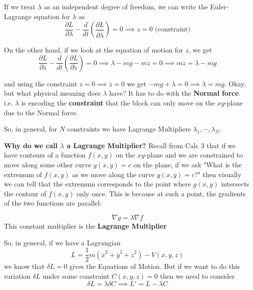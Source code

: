 \documentclass[11pt]{article}
\begin{document}
\vskip 0.5cm
If we treat $\lambda$ as an independent degree of freedom, we can write the Euler-Lagrange equation for $\lambda$ as 
\[ \frac{\partial L}{\partial \lambda} - \frac{d}{dt} \left(\frac{\partial L}{\partial \dot{\lambda}}\right) = 0 \implies z = 0 \text{ (constraint)} \]

On the other hand, if we look at the equation of motion for $z$, we get 
\[  \frac{\partial L}{\partial z} - \frac{d}{dt} \left(\frac{\partial L}{\partial \dot{z}}\right) = 0 \implies \lambda - mg - m\ddot{z} = 0 \implies m\ddot{z} = \lambda - mg \]

and using the constraint $z = 0 \implies \ddot{z} = 0$ we get $-mg + \lambda = 0 \implies \lambda = mg$. Okay, but what physical meaning does $\lambda$ have? It has to do with the \textbf{Normal force}. i.e. $\lambda$ is encoding the \textbf{constraint} that the block can only move on the $xy$-plane due to the Normal force. 

\begin{redbox}
  So, in general, for $N$ constraints we have Lagrange Multipliers $\lambda_1, \cdots, \lambda_N$.
\end{redbox}

\begin{bluebox}
  \textbf{Why do we call $\lambda$ a Lagrange Multiplier?}
  \vskip 0.5cm
  Recall from Calc 3 that if we have contours of a function $f(x,y)$ on the $xy$-plane and we are constrained to move along some other curve $g(x,y) = c$ on the plane, if we ask 
  \color{blue}
  "What is the extremum of $f(x,y)$ as we move along the curve $g(x,y) = c$?"
  \color{black} then visually we can tell that the extremum corresponds to the point where $g(x,y)$ intersects the contour of $f(x,y)$ only once. This is because at such a point, the gradients of the two functions are parallel:

  \[ \nabla g = \lambda \nabla f \]
  This constant multiplier is the \textbf{Lagrange Multiplier}
\end{bluebox}

So, in general, if we have a Lagrangian 
\[ L = \frac{1}{2}m \left(\dot{x}^2 + \dot{y}^2 + \dot{z}^2\right) - V(x,y,z) \]
we know that $\delta L = 0$ gives the Equations of Motion. But if we want to do this variation $\delta L$ under some constraint $C(x,y,z) = 0$ then we need to consider 
\[ \delta L = \lambda \delta C \implies L' = L - \lambda C \]
\end{document}
